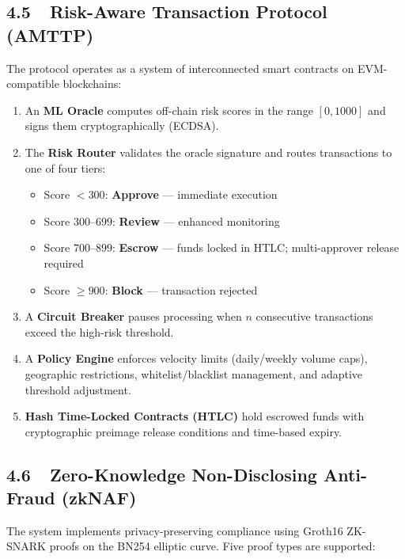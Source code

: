\documentclass[12pt,a4paper]{article}
\begin{document}
\subsection{4.5~~Risk-Aware Transaction Protocol (AMTTP)}

The protocol operates as a system of interconnected smart contracts on
EVM-compatible blockchains:

\begin{enumerate}
\item An \textbf{ML Oracle} computes off-chain risk scores in the range
  $[0, 1000]$ and signs them cryptographically (ECDSA).

\item The \textbf{Risk Router} validates the oracle signature and routes
  transactions to one of four tiers:
  \begin{itemize}
    \item Score $< 300$: \textbf{Approve} --- immediate execution
    \item Score $300$--$699$: \textbf{Review} --- enhanced monitoring
    \item Score $700$--$899$: \textbf{Escrow} --- funds locked in HTLC;
      multi-approver release required
    \item Score $\geq 900$: \textbf{Block} --- transaction rejected
  \end{itemize}

\item A \textbf{Circuit Breaker} pauses processing when $n$ consecutive
  transactions exceed the high-risk threshold.

\item A \textbf{Policy Engine} enforces velocity limits (daily/weekly volume
  caps), geographic restrictions, whitelist/blacklist management, and
  adaptive threshold adjustment.

\item \textbf{Hash Time-Locked Contracts (HTLC)} hold escrowed funds with
  cryptographic preimage release conditions and time-based expiry.
\end{enumerate}

\subsection{4.6~~Zero-Knowledge Non-Disclosing Anti-Fraud (zkNAF)}

The system implements privacy-preserving compliance using Groth16 ZK-SNARK
proofs on the BN254 elliptic curve.  Five proof types are supported:
\end{document}
